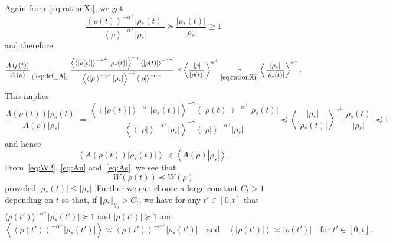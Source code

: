 \documentclass[AHL,Unicode,longabstracts,published]{cedram}
\newcommand*\eq[1]{\underset{(#1)}{=}}
\begin{document}
Again from~\eqref{eq:rationXi}, we get
\[
\frac{\left\langle \rho(t)\right\rangle ^{-\alpha^{\perp}}\left|\rho_{*}(t)\right|}{\left\langle \rho\right\rangle ^{-\alpha^{\perp}}\left|\rho_{*}\right|}\succeq\frac{\left|\rho_{*}(t)\right|}{\left|\rho_{*}\right|}\ge1
\]
and therefore
\[
\frac{A\left(\rho(t)\right)}{A\left(\rho\right)}\eq{\ref{eq:def_A}}\frac{\left\langle \left\langle \left|\rho(t)\right|\right\rangle ^{-\alpha^{\perp}}\left|\rho_{*}(t)\right|\right\rangle ^{-\gamma}\left\langle \left|\rho(t)\right|\right\rangle ^{-\alpha^{\perp}}}{\left\langle \left\langle \left|\rho\right|\right\rangle ^{-\alpha^{\perp}}\left|\rho_{*}\right|\right\rangle ^{-\gamma}\left\langle \left|\rho\right|\right\rangle ^{-\alpha^{\perp}}}\preceq\left\langle \frac{\left|\rho\right|}{\left|\rho(t)\right|}\right\rangle ^{\alpha^{\perp}}\underset{\eqref{eq:rationXi}}{\preceq}\left\langle \frac{\left|\rho_{*}\right|}{\left|\rho_{*}(t)\right|}\right\rangle ^{\alpha^{\perp}}.
\]
This implies
\[
\frac{A\left(\rho(t)\right)\left|\rho{}_{s}(t)\right|}{A\left(\rho\right)\left|\rho{}_{s}\right|}=\frac{\left\langle \left\langle \left|\rho(t)\right|\right\rangle ^{-\alpha^{\perp}}\left|\rho_{*}(t)\right|\right\rangle ^{-\gamma}\left\langle \left|\rho(t)\right|\right\rangle ^{-\alpha^{\perp}}\left|\rho{}_{s}(t)\right|}{\left\langle \left\langle \left|\rho\right|\right\rangle ^{-\alpha^{\perp}}\left|\rho_{*}\right|\right\rangle ^{-\gamma}\left\langle \left|\rho\right|\right\rangle ^{-\alpha^{\perp}}\left|\rho{}_{s}\right|}\preceq\left\langle \frac{\left|\rho_{*}\right|}{\left|\rho_{*}(t)\right|}\right\rangle ^{\alpha^{\perp}}\frac{\left|\rho{}_{s}(t)\right|}{\left|\rho{}_{s}\right|}\preceq1
\]
and hence
\begin{equation}\label{eq:As}
\left\langle A\left(\rho(t)\right)\left|\rho{}_{s}(t)\right|\right\rangle \preceq\left\langle A\left(\rho\right)\left|\rho_{s}\right|\right\rangle.
\end{equation}
From~\eqref{eq:W2}, \eqref{eq:Au} and~\eqref{eq:As}, we see that
\[
W\left(\rho(t)\right)\preceq W\left(\rho\right)
\]
provided $|\rho_{*}(t)|\leq|\rho_{*}|$. Further we can choose a large constant $C_{t}>1$ depending on $t$ so that, if $\Vert \rho_{*}\Vert _{g_{\rho}}>C_{t}$, we have for any $t'\in[0,t]$ that $\langle \rho(t')\rangle ^{-\alpha^{\perp}}|\rho_{*}(t')|\succeq1$ and $|\rho(t')|\succeq1$ and
\[
\left\langle \left\langle \rho(t')\right\rangle ^{-\alpha^{\perp}}\left|\rho_{*}(t')\right|\right\rangle \asymp\left\langle \rho(t')\right\rangle ^{-\alpha^{\perp}}\left|\rho_{*}(t')\right|\quad\text{and}\quad\left\langle \left|\rho(t')\right|\right\rangle \asymp\left|\rho(t')\right|\quad\text{for }t'\in\left[0,t\right].
\]
\end{document}
